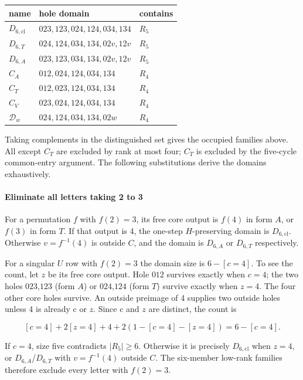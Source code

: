 \documentclass[11pt]{article}
\theoremstyle{definition}
\theoremstyle{plain}
\begin{document}
\begin{center}
\begin{tabular}{lll}
\toprule
name  &  hole domain  &  contains \\
\midrule

\(D_{6,\mathrm{cl}}\) & \(023,123,024,124,034,134\) & \(R_{5}\)\\
\(D_{6,T}\) & \(024,124,034,134,02v,12v\) & \(R_{5}\)\\
\(D_{6,A}\) & \(023,123,034,134,02v,12v\) & \(R_{5}\)\\
\(C_A\) & \(012,024,124,034,134\) & \(R_{4}\)\\
\(C_T\) & \(012,023,124,034,134\) & \(R_{4}\)\\
\(C_V\) & \(023,024,124,034,134\) & \(R_{4}\)\\
\(\mathcal D_w\) & \(024,124,034,134,02w\) & \(R_{4}\)\\
\bottomrule
\end{tabular}
\end{center}

Taking complements in the distinguished set gives the occupied families
above. All except \(C_T\) are excluded by rank at most four; \(C_T\) is
excluded by the five-cycle common-entry argument. The following
substitutions derive the domains exhaustively.

\paragraph{Eliminate all letters taking 2 to
3}\label{eliminate-all-letters-taking-2-to-3}

For a permutation \(f\) with \(f(2)=3\), its free core output is \(f(4)\) in
form \(A\), or \(f(3)\) in form \(T\). If that output is 4, the one-step
\(H\)-preserving domain is \(D_{6,\mathrm{cl}}\). Otherwise \(v=f^{-1}(4)\)
is outside \(C\), and the domain is \(D_{6,A}\) or \(D_{6,T}\)
respectively.

For a singular \(U\) row with \(f(2)=3\) the domain size is
\(6-[c=4]\). To see the count, let \(z\) be its free core output.
Hole \(012\) survives exactly when \(c=4\); the two holes \(023\),\(123\) (form
\(A\)) or \(024\),\(124\) (form \(T\)) survive exactly when \(z=4\). The four
other core holes survive. An outside preimage of 4 supplies two outside
holes unless 4 is already c or \(z\). Since c and \(z\) are distinct,
the count is

\[
[c=4]+2[z=4]+4+2(1-[c=4]-[z=4])=6-[c=4].
\]

If \(c=4\), size five contradicts \(|R_{5}|\ge 6\). Otherwise it is
precisely \(D_{6,\mathrm{cl}}\) when \(z=4\), or \(D_{6,A}\)/\(D_{6,T}\)
with \(v=f^{-1}(4)\) outside \(C\). The six-member low-rank families
therefore exclude every letter with \(f(2)=3\).
\end{document}
